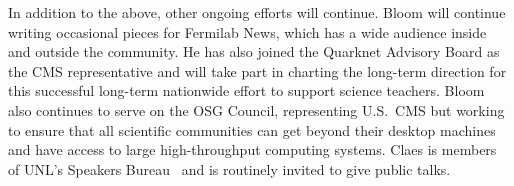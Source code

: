 In addition to the above, other ongoing efforts will continue.  Bloom will continue writing occasional pieces for Fermilab News, which has a wide audience inside and outside the community.  He has also joined the Quarknet Advisory Board as the CMS representative and will take part in charting the long-term direction for this successful long-term nationwide effort to support science teachers.  Bloom also continues to serve on the OSG Council, representing U.S.~CMS but working to ensure that all scientific communities can get beyond their desktop machines and have access to large high-throughput computing systems. 
Claes is members of UNL's Speakers Bureau~\cite{bib:speakers} and is routinely invited to give public talks.

